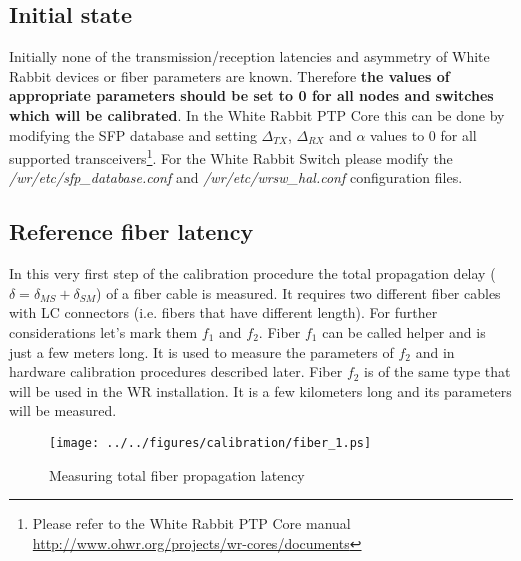 \subsection{Initial state}
Initially none of the transmission/reception latencies and asymmetry of White 
Rabbit devices or fiber parameters are known. Therefore {\bf the values of 
appropriate parameters should be set to 0 for all nodes and switches which will
be calibrated}. In the White Rabbit PTP Core this can be done by modifying the SFP
database and setting $\Delta_{TX}$, $\Delta_{RX}$ and $\alpha$ values to 0 for all
supported transceivers\footnote{Please refer to the White Rabbit PTP Core manual
\url{http://www.ohwr.org/projects/wr-cores/documents}}. For the White Rabbit Switch 
please modify the \emph{/wr/etc/sfp\_database.conf} and
\emph{/wr/etc/wrsw\_hal.conf} configuration files.

\subsection{Reference fiber latency}
\label{subsec:refiber}

In this very first step of the calibration procedure the total propagation delay
($\delta = \delta_{MS} + \delta_{SM}$) of a fiber cable is measured. It requires
two different fiber cables with LC connectors (i.e. fibers that have
different length). For further considerations let's mark them $f_1$ and $f_2$.
Fiber $f_1$ can be called helper and is just a few meters long. It is used to
measure the parameters of $f_2$ and in hardware calibration procedures described
later. Fiber $f_2$ is of the same type that will be used in the WR installation.
It is a few kilometers long and its parameters will be measured.

\begin{figure}[ht]
	\begin{center}
		\texttt{[image: ../../figures/calibration/fiber\_1.ps]}
		\caption{Measuring total fiber propagation latency}
		\label{fig:refiber:latency}
	\end{center}
\end{figure}

